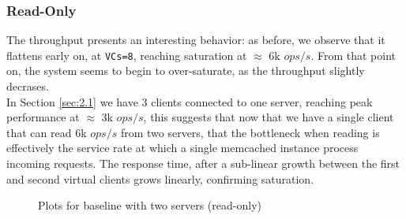 \documentclass[11pt,a4paper]{article}
\begin{document}
\subsubsection*{Read-Only}

The throughput presents an interesting behavior: as before, we observe that it flattens early on, at \texttt{VCs=8}, reaching saturation at $\approx$ 6k $ops/s$. From that point on, the system seems to begin to over-saturate, as the throughput slightly decrases.\\
In Section \ref{sec:2.1} we have 3 clients connected to one server, reaching peak performance at $\approx$ 3k $ops/s$, this suggests that now that we have a single client that can read 6k $ops/s$ from two servers, that the bottleneck when reading is effectively the service rate at which a single memcached instance process incoming requests. The response time, after a sub-linear growth between the first and second virtual clients grows linearly, confirming saturation.

\begin{figure}[!h]
  \centering
  \caption{Plots for baseline with two servers (read-only)}
  \label{fig:baseline_no_mw_2_server_ro}
\end{figure}
\end{document}
